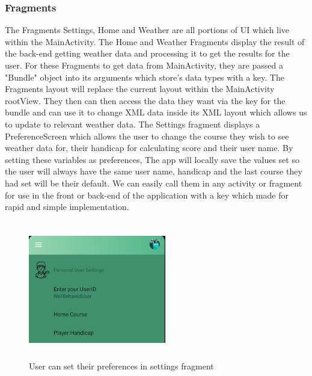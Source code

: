 \subsubsection{Fragments}
The Fragments Settings, Home and Weather are all portions of UI which live within the MainActivity. The Home and Weather Fragments display the \newline result of the back-end getting weather data and processing it to get the \newline results for the user. For these Fragments to get data from MainActivity, they are passed a "Bundle" object into its arguments which store's data types with a key. The Fragments layout will replace the current layout within the MainActivity rootView. They then can then access the data they want via the key for the bundle and can use it to change XML data inside its XML layout which allows us to update to relevant weather data.
\newline
\newline
The Settings fragment displays a PreferenceScreen which allows the user to change the course they wish to see weather data for, their handicap for calculating score and their user name. By setting these variables as preferences, The app will locally save the values set so the user will always have the same user name, handicap and the last course they had set will be their default. We can easily call them in any activity or fragment for use in the front or back-end of the application with a key which made for rapid and simple implementation.
\begin{figure}[H]
    \centering
    \includegraphics[width=6cm, height = 6cm]{img/Settings_frag.PNG}
    \caption{User can set their preferences in settings fragment}
    \label{fig:User can set their preferences in settings fragment}
\end{figure}

